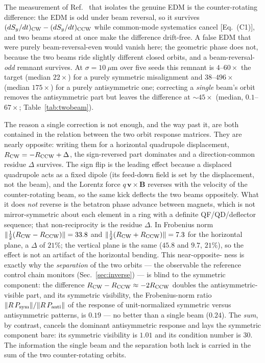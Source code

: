 \documentclass[aps,prab,reprint,superscriptaddress,nofootinbib]{revtex4-2}
\begin{document}
The measurement of Ref.~\cite{omarov} that isolates the genuine EDM is the
counter-rotating difference: the EDM is odd under beam reversal, so it survives
$(dS_y/dt)_{\rm CW}-(dS_y/dt)_{\rm CCW}$ while common-mode systematics cancel
[Eq.~(C1)], and two beams stored at once make the difference drift-free.  A
false EDM that were purely beam-reversal-even would vanish here; the geometric
phase does not, because the two beams ride slightly different closed orbits, and
a beam-reversal-\emph{odd} remnant survives.  At $\sigma=10~\mu$m over five
seeds this remnant is $4$--$60\times$ the target (median $22\times$) for a purely
symmetric misalignment and $38$--$496\times$ (median $175\times$) for a purely
antisymmetric one; correcting a \emph{single} beam's orbit removes the
antisymmetric part but leaves the difference at $\sim\!45\times$ (median,
$0.1$--$67\times$; Table~\ref{tab:twobeam}).

The reason a single correction is not enough, and the way past it, are both
contained in the relation between the two orbit response matrices.  They are
nearly opposite: writing them for a horizontal quadrupole displacement,
$R_{\rm CW}=-R_{\rm CCW}+\Delta$, the sign-reversed part dominates and a
direction-common residue $\Delta$ survives.  The sign flip is the leading effect
because a displaced quadrupole acts as a fixed dipole (its feed-down field is set
by the displacement, not the beam), and the Lorentz force $q\,\bm v\times\bm B$
reverses with the velocity of the counter-rotating beam, so the same kick
deflects the two beams oppositely.  What it does \emph{not} reverse is the
betatron phase advance between magnets, which is not mirror-symmetric about each
element in a ring with a definite QF/QD/deflector sequence; that non-reciprocity
is the residue $\Delta$.  In Frobenius norm
$\lVert\tfrac12(R_{\rm CW}-R_{\rm CCW})\rVert=33.8$ and
$\lVert\tfrac12(R_{\rm CW}+R_{\rm CCW})\rVert=7.3$ for the horizontal plane, a
$\Delta$ of $21\%$; the vertical plane is the same ($45.8$ and $9.7$, $21\%$),
so the effect is not an artifact of the horizontal bending.  This near-opposite-\-
ness is exactly why the \emph{separation} of the two orbits --- the observable
the reference control chain monitors (Sec.~\ref{sec:inverse}) --- is blind to
the symmetric component: the difference $R_{\rm CW}-R_{\rm CCW}\approx-2R_{\rm
CCW}$ doubles the antisymmetric-visible part, and its symmetric visibility, the
Frobenius-norm ratio $\lVert R\,P_{\rm sym}\rVert/\lVert R\,P_{\rm anti}\rVert$
of the response of unit-normalized symmetric versus antisymmetric patterns, is
$0.19$ --- no better than a single beam ($0.24$).  The \emph{sum}, by contrast,
cancels the dominant antisymmetric response and lays the symmetric component
bare: its symmetric visibility is $1.01$ and its condition number is $30$.  The
information the single beam and the separation both lack is carried in the sum
of the two counter-rotating orbits.
\end{document}

